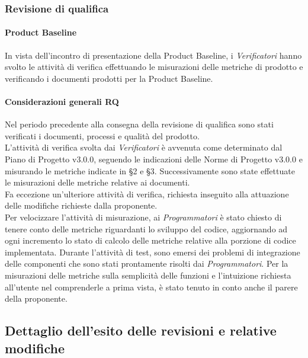 	\subsubsection{Revisione di qualifica}
	\paragraph{Product Baseline}
	In vista dell'incontro di presentazione della Product Baseline, i \textit{Verificatori} hanno svolto le attività di verifica effettuando le misurazioni delle metriche di prodotto e verificando i documenti prodotti per la Product Baseline.
	
			
	\paragraph{Considerazioni generali RQ}
	Nel periodo precedente alla consegna della revisione di qualifica sono stati verificati i documenti, processi e qualità del prodotto. \\
	L'attività di verifica svolta dai \textit{Verificatori} è avvenuta come determinato dal Piano di Progetto v3.0.0, seguendo le indicazioni delle Norme di Progetto v3.0.0 e misurando le metriche indicate in §2 e §3.  Successivamente sono state effettuate le misurazioni delle metriche relative ai documenti. \\
	Fa eccezione un'ulteriore attività di verifica, richiesta inseguito alla attuazione delle modifiche richieste dalla proponente. \\
	Per velocizzare l'attività di misurazione, ai \textit{Programmatori} è stato chiesto di tenere conto delle metriche riguardanti lo sviluppo del codice, aggiornando ad ogni incremento lo stato di calcolo delle metriche relative alla porzione di codice implementata.
	Durante l'attività di test, sono emersi dei problemi di integrazione delle componenti che sono stati prontamente risolti dai \textit{Programmatori}. 
	Per la misurazioni delle metriche sulla semplicità delle funzioni e l'intuizione richiesta all'utente nel comprenderle a prima vista, è  stato tenuto in conto anche il parere della proponente. 
	\newpage
\subsection{Dettaglio dell'esito delle revisioni e relative modifiche}
